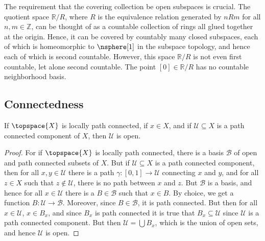 \documentclass{article}                                                        %
\begin{document}
            The requirement that the covering collection be open subspaces is
            crucial. The quotient space $\mathbb{R}/R$, where $R$ is the equivalence
            relation generated by $nRm$ for all $n,m\in\mathbb{Z}$, can be thought
            of as a countable collection of rings all glued together at the origin.
            Hence, it can be covered by countably many closed subspaces, each of
            which is homeomorphic to $\nsphere[1]$ in the subspace topology, and
            hence each of which is second countable. However, this space
            $\mathbb{R}/R$ is not even first countable, let alone second countable.
            The point $[0]\in\mathbb{R}/R$ has no countable neighborhood basis.
        \subsection{Connectedness}
            \begin{theorem}
                \label{thm:loc_path_con_imply_path_comps_open}%
                If $\topspace{X}$ is locally path connected, if $x\in{X}$, and if
                $\mathcal{U}\subseteq{X}$ is a path connected component of $X$,
                then $\mathcal{U}$ is open.
            \end{theorem}
            \begin{proof}
                For if $\topspace{X}$ is locally path connected, there is a basis
                $\mathcal{B}$ of open and path connected subsets of $X$. But if
                $\mathcal{U}\subseteq{X}$ is a path connected component, then for
                all $x,y\in\mathcal{U}$ there is a path
                $\gamma:[0,1]\rightarrow\mathcal{U}$ connecting $x$ and $y$, and for
                all $z\in{X}$ such that $z\notin\mathcal{U}$, there is no path
                between $x$ and $z$. But $\mathcal{B}$ is a basis, and hence for
                all $x\in\mathcal{U}$ there is a $B\in\mathcal{B}$ such that
                $x\in{B}$. By choice, we get a function
                $B:\mathcal{U}\rightarrow\mathcal{B}$. Moreover, since
                $B\in\mathcal{B}$, it is path connected. But then for all
                $x\in\mathcal{U}$, $x\in{B}_{x}$, and since $B_{x}$ is path
                connected it is true that $B_{x}\subseteq\mathcal{U}$ since
                $\mathcal{U}$ is a path connected component. But then
                $\mathcal{U}=\bigcup{B}_{x}$, which is the union of open sets, and
                hence $\mathcal{U}$ is open.
            \end{proof}
\end{document}
